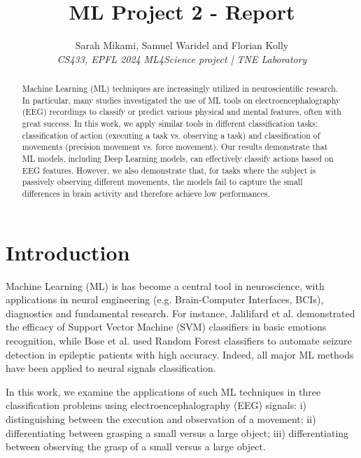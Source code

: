 \documentclass[10pt,conference,compsocconf]{IEEEtran}
\begin{document}
\title{ML Project 2 - Report}

\author{
  Sarah Mikami, Samuel Waridel and Florian Kolly \\
  \textit{CS433, EPFL 2024}
  \textit{ML4Science project | TNE Laboratory}
}

\maketitle

\begin{abstract}
    Machine Learning (ML) techniques are increasingly utilized in neuroscientific research. In particular, many studies investigated the use of ML tools on electroencephalography (EEG) recordings to classify or predict various physical and mental features, often with great success. In this work, we apply similar tools in different classification tasks: classification of action (executing a task vs. observing a task) and classification of movements (precision movement vs. force movement). Our results demonstrate that ML models, including Deep Learning models, can effectively classify actions based on EEG features. However, we also demonstrate that, for tasks where the subject is passively observing different movements, the models fail to capture the small differences in brain activity and therefore achieve low performances.
\end{abstract}

\section{Introduction}
Machine Learning (ML) is has become a central tool in neuroscience, with applications in neural engineering (e.g. Brain-Computer Interfaces, BCIs), diagnostics and fundamental research. For instance, Jalilifard et al. \cite{EmotionClassificationSVM} demonstrated the efficacy of Support Vector Machine (SVM) classifiers in basic emotions recognition, while Bose et al. \cite{EEGRandomForset} used Random Forest classifiers to automate seizure detection in epileptic patients with high accuracy. Indeed, all major ML methods have been applied to neural signals classification\cite{EEGMLReview}.

In this work, we examine the applications of such ML techniques in three classification problems using electroencephalography (EEG) signals: i) distinguishing between the execution and observation of a movement; ii) differentiating between grasping a small versus a large object; iii) differentiating between observing the grasp of a small versus a large object.
\end{document}
